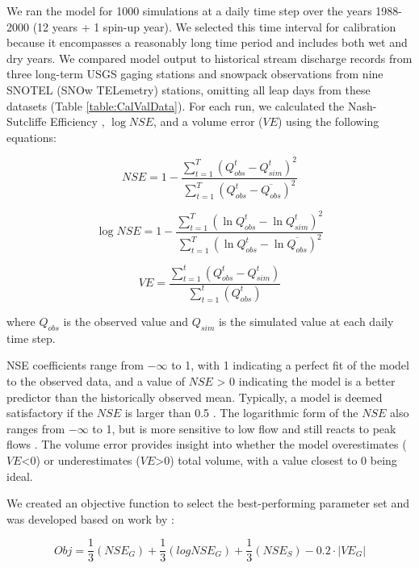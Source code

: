 \documentclass[11pt,letterpaper]{article}
\begin{document}
We ran the model for 1000 simulations at a daily time step over the years 1988-2000 (12 years + 1 spin-up year). We selected this time interval for calibration because it encompasses a reasonably long time period and includes both wet and dry years. We compared model output to historical stream discharge records from three long-term USGS gaging stations and snowpack observations from nine SNOTEL (SNOw TELemetry) stations, omitting all leap days from these datasets (Table \ref{table:CalValData}). For each run, we calculated the Nash-Sutcliffe Efficiency \citep[$NSE$,][]{Nash:1970vw}, $\log NSE$, and a volume error ($VE$) using the following equations:

\begin{equation}
NSE = 1 - \frac{\sum_{t=1}^{T} \left(Q_{obs}^t - Q_{sim}^t\right)^2}{\sum_{t=1}^{T} \left(Q_{obs}^t - \overline{Q_{obs}}\right)^2}
\end{equation}

\begin{equation}
\log NSE = 1 - \frac{\sum_{t=1}^{T} \left(\ln{Q_{obs}^t} - \ln{Q_{sim}^t}\right)^2}{\sum_{t=1}^{T} \left(\ln{Q_{obs}^t} - \ln{\overline{Q_{obs}}}\right)^2}
\end{equation}

\begin{equation}
VE = \frac{\sum_{t=1}^{t} \left(Q_{obs}^t - Q_{sim}^t\right)}{\sum_{t=1}^{t} \left(Q_{obs}^t\right)}
\end{equation}

where $Q_{obs}$ is the observed value and $Q_{sim}$ is the simulated value at each daily time step.

NSE coefficients range from $-\infty$ to 1, with 1 indicating a perfect fit of the model to the observed data, and a value of $NSE$ > 0 indicating the model is a better predictor than the historically observed mean. Typically, a model is deemed satisfactory if the $NSE$ is larger than 0.5 \citep{NMoriasi:2007tj}. The logarithmic form of the $NSE$ also ranges from $-\infty$ to 1, but is more sensitive to low flow and still reacts to peak flows \citep{krause:hal-00296842}. The volume error provides insight into whether the model overestimates ($VE$<0) or underestimates ($VE$>0) total volume, with a value closest to 0 being ideal.

We created an objective function to select the best-performing parameter set and was developed based on work by \citep{Inouye:2014ws}:

\begin{equation}
Obj = \frac{1}{3}\left(NSE_G\right) + \frac{1}{3}\left(logNSE_G\right) + \frac{1}{3}\left(NSE_S\right) - 0.2\cdot\left|VE_G\right|
\end{equation}
\end{document}
